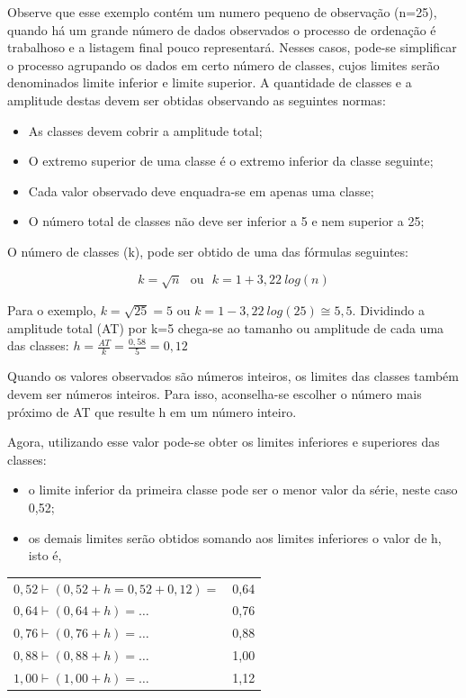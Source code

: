 \newpage
Observe que esse exemplo contém um numero pequeno de observação (n=25), quando há um grande número de dados observados o processo de ordenação é trabalhoso e a listagem final pouco representará. Nesses casos, pode-se simplificar o processo agrupando os dados em certo número de classes, cujos limites serão denominados limite inferior e limite superior. A quantidade de classes e a amplitude destas devem ser obtidas observando as seguintes normas:

\begin{itemize}
  \item As classes devem cobrir a amplitude total;
  \item O extremo superior de uma classe é o extremo inferior da classe seguinte;
  \item Cada valor observado deve enquadra-se em apenas uma classe;
  \item O número total de classes não deve ser inferior a 5 e nem superior a 25;
\end{itemize}

O número de classes (k), pode ser obtido de uma das fórmulas seguintes:

$$ k=\sqrt{n} \ \ \ \mbox{ou} \ \ \  k=1+3,22 \ log(n)$$



Para o exemplo, $k=\sqrt{25}=5$ ou $k=1-3,22 \ log(25)\cong 5,5$. Dividindo a amplitude total (AT) por k=5 chega-se ao tamanho ou amplitude de cada uma das classes: $h=\frac{AT}{k}=\frac{0,58}{5}=0,12$\vskip0.3cm

Quando os valores observados são números inteiros, os limites das classes também devem ser números inteiros. Para isso, aconselha-se escolher o número mais próximo de AT que resulte h em um número inteiro.\vskip0.3cm


\newpage
Agora, utilizando esse valor pode-se obter os limites inferiores e superiores das classes:

\begin{itemize}
  \item o limite inferior da primeira classe pode ser o menor valor da série, neste caso 0,52;
  \item os demais limites serão obtidos somando aos limites inferiores o valor de h, isto é,
\end{itemize}

\begin{table}[h]
    \centering
    {
    \label{}
    \vspace{-0.5cm}
\begin{tabular}{l|c}
\hline\hline  
  $0,52 \vdash (0,52+ h=0,52+0,12)=$ & 0,64 \\
  $0,64 \vdash (0,64+ h)= \ldots $   & 0,76 \\
  $0,76 \vdash (0,76+ h)= \ldots $   & 0,88 \\
  $0,88 \vdash (0,88+ h)= \ldots $   & 1,00 \\
  $1,00 \vdash (1,00+ h)= \ldots $   & 1,12 \\
\hline\hline    
\end{tabular}}
\end{table}

